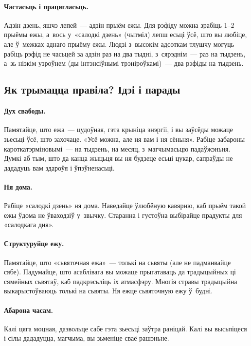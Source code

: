 \paragraph{Частасьць і працягласьць.}
Адзін дзень, яшчэ лепей~--- адзін прыём ежы. Для рэфіду можна зрабіць 1--2 прыёмы ежы, а~вось у~«салодкі дзень» (чытміл) лепш есьці ўсё, што вы любіце, але ў~межках аднаго прыёму ежы. Людзі з~высокім адсоткам тлушчу могуць рабіць рэфід не часьцей за адзін раз на два тыдні, з~сярэднім~--- раз на тыдзень, а~зь нізкім узроўнем (ды інтэнсіўнымі трэніроўкамі)~--- два рэфіды на тыдзень.

\subsection{Як трымацца правіла? Ідэі і парады}

\paragraph{Дух свабоды.}
Памятайце, што ежа~--- цудоўная, гэта крыніца энэргіі, і вы заўсёды можаце зьесьці ўсё, што захочаце. «Усё можна, але ня вам і ня сёньня». Рабіце забароны кароткатэрміновымі~--- на тыдзень, на месяц, з~магчымасьцю падаўжэньня. Думкі аб тым, што да канца жыцьця вы ня будзеце есьці цукар, сапраўды не дададуць вам здароўя і ўпэўненасьці.

\paragraph{Ня дома.}
Рабіце «салодкі дзень» ня дома. Наведайце ўлюбёную кавярню, каб прыём такой ежы ўдома не ўваходзіў у~звычку. Старанна і густоўна выбірайце прадукты для «салодкага дня».

\paragraph{Структуруйце ежу.}
Памятайце, што «сьвяточная ежа»~--- толькі на сьвяты (але не падманвайце сябе). Падумайце, што асаблівага вы можаце прыгатаваць да традыцыйных ці сямейных сьвятаў, каб падкрэсьліць іх атмасфэру. Многія стравы традыцыйна выкарыстоўваюць толькі на сьвяты. Ня ежце сьвяточную ежу ў~будні.

\paragraph{Абарона часам.}
Калі цяга моцная, дазвольце сабе гэта зьесьці заўтра раніцай. Калі вы высьпіцеся і сілы дададуцца, магчыма, вы зьменіце сваё рашэньне.

